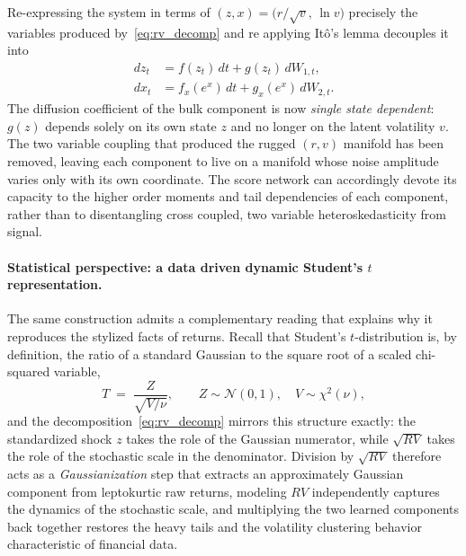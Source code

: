 \documentclass[sigconf,natbib=false]{acmart}
\begin{document}
Re-expressing the system in terms of $(z, x) = \bigl(r/\sqrt{v},\, \ln v\bigr)$ precisely the variables produced by~\eqref{eq:rv_decomp} and re applying It\^{o}'s lemma decouples it into
\begin{align}
    dz_t &= f(z_t)\, dt + g(z_t)\, dW_{1,t}, \\
    dx_t &= f_x(e^{x})\, dt + g_x(e^{x})\, dW_{2,t}.
\end{align}
The diffusion coefficient of the bulk component is now \emph{single state dependent}: $g(z)$ depends solely on its own state $z$ and no longer on the latent volatility $v$. The two variable coupling that produced the rugged $(r,v)$ manifold has been removed, leaving each component to live on a manifold whose noise amplitude varies only with its own coordinate. The score network can accordingly devote its capacity to the higher order moments and tail dependencies of each component, rather than to disentangling cross coupled, two variable heteroskedasticity from signal.


\paragraph{Statistical perspective: a data driven dynamic Student's $t$ representation.}
The same construction admits a complementary reading that explains why it reproduces the stylized facts of returns. Recall that Student's $t$-distribution is, by definition, the ratio of a standard Gaussian to the square root of a scaled chi-squared variable,
\begin{equation}
    T \;=\; \frac{Z}{\sqrt{V/\nu}}, \qquad Z \sim \mathcal{N}(0,1), \quad V \sim \chi^{2}(\nu),
    \label{eq:student_t}
\end{equation}
and the decomposition~\eqref{eq:rv_decomp} mirrors this structure exactly: the standardized shock $z$ takes the role of the Gaussian numerator, while $\sqrt{RV}$ takes the role of the stochastic scale in the denominator. Division by $\sqrt{RV}$ therefore acts as a \emph{Gaussianization} step that extracts an approximately Gaussian component from leptokurtic raw returns, modeling $RV$ independently captures the dynamics of the stochastic scale, and multiplying the two learned components back together restores the heavy tails and the volatility clustering behavior characteristic of financial data.
\end{document}
